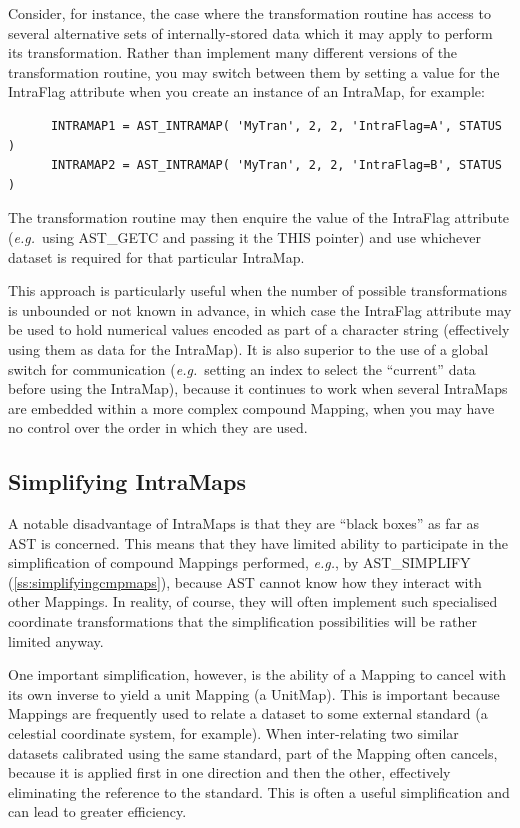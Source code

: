 \documentclass[twoside,11pt]{article}
\newcommand{\htmlref}[2]{#1}
\newcommand{\xlabel}[1]{}
\newcommand{\secref}[1]{\S\ref{#1}}
\renewcommand{\secref}[1]{\ref{#1}}
\begin{document}
Consider, for instance, the case where the transformation routine has
access to several alternative sets of internally-stored data which it
may apply to perform its transformation. Rather than implement many
different versions of the transformation routine, you may switch
between them by setting a value for the IntraFlag attribute when you
create an instance of an IntraMap, for example:

\small
\begin{verbatim}
      INTRAMAP1 = AST_INTRAMAP( 'MyTran', 2, 2, 'IntraFlag=A', STATUS )
      INTRAMAP2 = AST_INTRAMAP( 'MyTran', 2, 2, 'IntraFlag=B', STATUS )
\end{verbatim}
\normalsize

The transformation routine may then enquire the value of the IntraFlag
attribute ({\em{e.g.}}\ using AST\_GETC and passing it the THIS
pointer) and use whichever dataset is required for that particular
IntraMap.

This approach is particularly useful when the number of possible
transformations is unbounded or not known in advance, in which case
the IntraFlag attribute may be used to hold numerical values encoded
as part of a character string (effectively using them as data for the
IntraMap). It is also superior to the use of a global switch for
communication ({\em{e.g.}}\ setting an index to select the ``current''
data before using the IntraMap), because it continues to work when
several IntraMaps are embedded within a more complex compound \htmlref{Mapping}{Mapping},
when you may have no control over the order in which they are used.

\subsection{\xlabel{MaxTran}\label{ss:simplifyingintramaps}Simplifying IntraMaps}

A notable disadvantage of IntraMaps is that they are ``black boxes''
as far as AST is concerned. This means that they have limited ability
to participate in the simplification of compound Mappings performed,
{\em{e.g.}}, by \htmlref{AST\_SIMPLIFY}{AST_SIMPLIFY} (\secref{ss:simplifyingcmpmaps}),
because AST cannot know how they interact with other Mappings. In
reality, of course, they will often implement such specialised
coordinate transformations that the simplification possibilities will
be rather limited anyway.

One important simplification, however, is the ability of a \htmlref{Mapping}{Mapping} to
cancel with its own inverse to yield a unit Mapping (a \htmlref{UnitMap}{UnitMap}). This
is important because Mappings are frequently used to relate a dataset
to some external standard (a celestial coordinate system, for
example). When inter-relating two similar datasets calibrated using
the same standard, part of the Mapping often cancels, because it is
applied first in one direction and then the other, effectively
eliminating the reference to the standard. This is often a useful
simplification and can lead to greater efficiency.
\end{document}
